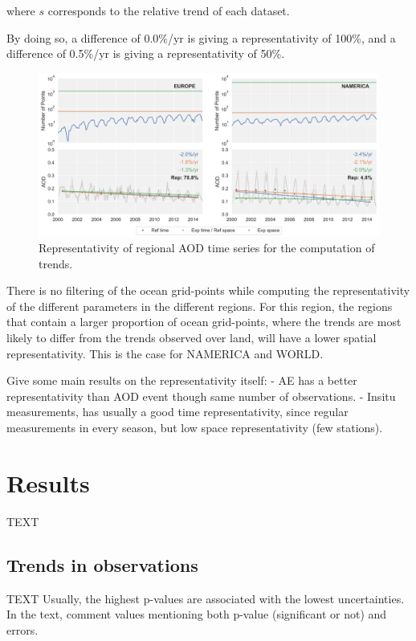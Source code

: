 \documentclass[journal abbreviation, manuscript]{copernicus}
\begin{document}
where $s$ corresponds to the relative trend of each dataset.

By doing so, a difference of 0.0\%/yr is giving a representativity of 100\%, and a difference of 0.5\%/yr is giving a representativity of 50\%.

\begin{figure}
 \includegraphics[width=\columnwidth]{../scripts/figs/representativity.png}
 \caption{Representativity of regional AOD time series for the computation of trends.}
 \label{representativity}
\end{figure}

There is no filtering of the ocean grid-points while computing the representativity of the different parameters in the different regions. For this region, the regions that contain a larger proportion of ocean grid-points, where the trends are most likely to differ from the trends observed over land, will have a lower spatial representativity. This is the case for NAMERICA and WORLD.

Give some main results on the representativity itself:
- AE has a better representativity than AOD event though same number of observations.
- Insitu measurements, has usually a good time representativity, since regular measurements in every season, but low space representativity (few stations).

\section{Results}
TEXT


\subsection{Trends in observations}
TEXT
Usually, the highest p-values are associated with the lowest uncertainties.
In the text, comment values mentioning both p-value (significant or not) and errors.
\end{document}
